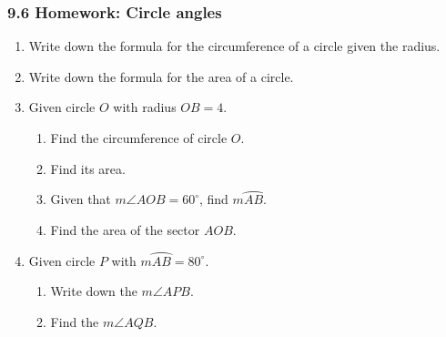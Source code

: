 \documentclass[12pt, twoside]{article}
\begin{document}
\subsubsection*{9.6 Homework: Circle angles}
 \begin{enumerate}

\item Write down the formula for the circumference of a circle given the radius. \vspace{1cm}
\item Write down the formula for the area of a circle. \vspace{1cm}

\item Given circle $O$ with radius $OB=4$.
  \begin{multicols}{2}
   \raggedcolumns
   \begin{enumerate}
     \item Find the circumference of circle $O$. \vspace{1.7cm}
     \item Find its area.  \vspace{2cm}
     \item Given that $m\angle AOB=60^\circ$, find $m \wideparen{AB}$. \vspace{1cm}%
     \item Find the area of the sector $AOB$. \vspace{1.5cm}
   \end{enumerate}
  \end{multicols}  \vspace{2cm}

\item Given circle $P$ with $m \wideparen{AB}=80^\circ$.
  \begin{multicols}{2}
   \raggedcolumns
   \begin{enumerate}
     \item Write down the $m\angle APB$. \vspace{1.7cm}
     \item Find the $m\angle AQB$. \vspace{2cm}
   \end{enumerate}
  \end{multicols}


\end{enumerate}
\end{document}
